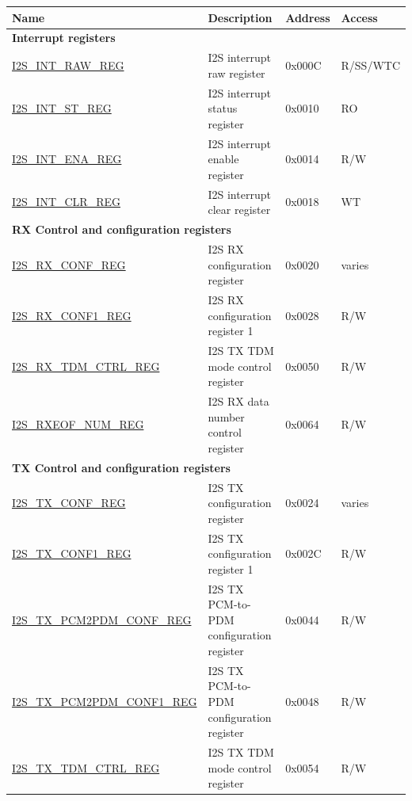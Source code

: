 \begin{longtable}{ | p{5.5cm} | p{7cm} | p{1.3cm} | p{2cm} | }
\hline\rowcolor{lightgray}
\textbf{Name} & \textbf{Description} &  \textbf{Address} & \textbf{Access} \\ \hline
\endhead
\multicolumn{4}{|l|}{\textbf{Interrupt registers}} \\ \hline
\hyperref[regdesc:I2SINTRAWREG]{I2S\_INT\_RAW\_REG} & I2S interrupt raw register  & 0x000C & R/SS/WTC \\ \hline
\hyperref[regdesc:I2SINTSTREG]{I2S\_INT\_ST\_REG} & I2S interrupt status register & 0x0010 & RO \\ \hline
\hyperref[regdesc:I2SINTENAREG]{I2S\_INT\_ENA\_REG} & I2S interrupt enable register & 0x0014 & R/W \\ \hline
\hyperref[regdesc:I2SINTCLRREG]{I2S\_INT\_CLR\_REG} & I2S interrupt clear register & 0x0018 & WT \\ \hline
\multicolumn{4}{|l|}{\textbf{RX Control and configuration registers}} \\ \hline
\hyperref[regdesc:I2SRXCONFREG]{I2S\_RX\_CONF\_REG} & I2S RX configuration register & 0x0020 & varies \\ \hline
\hyperref[regdesc:I2SRXCONF1REG]{I2S\_RX\_CONF1\_REG} & I2S RX configuration register 1 & 0x0028 & R/W \\ \hline
\hyperref[regdesc:I2SRXTDMCTRLREG]{I2S\_RX\_TDM\_CTRL\_REG} & I2S TX TDM mode control register & 0x0050 & R/W \\ \hline
\hyperref[regdesc:I2SRXEOFNUMREG]{I2S\_RXEOF\_NUM\_REG} & I2S RX data number control register & 0x0064 & R/W \\ \hline
\multicolumn{4}{|l|}{\textbf{TX Control and configuration registers}} \\ \hline
\hyperref[regdesc:I2STXCONFREG]{I2S\_TX\_CONF\_REG} & I2S TX configuration register & 0x0024 & varies \\ \hline
\hyperref[regdesc:I2STXCONF1REG]{I2S\_TX\_CONF1\_REG} & I2S TX configuration register 1 & 0x002C & R/W \\ \hline
\hyperref[regdesc:I2STXPCM2PDMCONFREG]{I2S\_TX\_PCM2PDM\_CONF\_REG} & I2S TX PCM-to-PDM configuration register & 0x0044 & R/W \\ \hline
\hyperref[regdesc:I2STXPCM2PDMCONF1REG]{I2S\_TX\_PCM2PDM\_CONF1\_REG} & I2S TX PCM-to-PDM configuration register & 0x0048 & R/W \\ \hline
\hyperref[regdesc:I2STXTDMCTRLREG]{I2S\_TX\_TDM\_CTRL\_REG} & I2S TX TDM mode control register & 0x0054 & R/W \\ \hline

\end{longtable}
